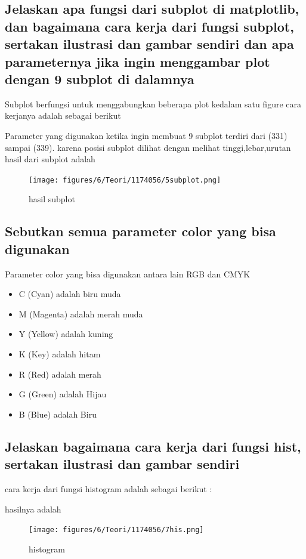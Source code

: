 \subsection{Jelaskan apa fungsi dari subplot di matplotlib, dan bagaimana cara kerja dari fungsi subplot, sertakan ilustrasi dan gambar sendiri dan apa parameternya jika ingin menggambar plot dengan 9 subplot di dalamnya}
Subplot berfungsi untuk menggabungkan beberapa plot kedalam satu figure
cara kerjanya adalah sebagai berikut

Parameter yang digunakan ketika ingin membuat 9 subplot terdiri dari (331) sampai (339). karena posisi subplot dilihat dengan melihat tinggi,lebar,urutan
hasil dari subplot adalah
\begin{figure}[H]
    \texttt{[image: figures/6/Teori/1174056/5subplot.png]}
    \caption{hasil subplot}
    \centering
\end{figure}

\subsection{Sebutkan semua parameter color yang bisa digunakan}
Parameter color yang bisa digunakan antara lain RGB dan CMYK
\begin{itemize}
    \item C (Cyan) adalah biru muda
    \item M (Magenta) adalah merah muda
    \item Y (Yellow) adalah kuning
    \item K (Key) adalah hitam
    \item R (Red) adalah merah
    \item G (Green) adalah Hijau
    \item B (Blue) adalah Biru
    
\end{itemize}

\subsection{Jelaskan bagaimana cara kerja dari fungsi hist, sertakan ilustrasi dan gambar sendiri}
cara kerja dari fungsi histogram adalah sebagai berikut :

hasilnya adalah
\begin{figure}[H]
    \texttt{[image: figures/6/Teori/1174056/7his.png]}
    \caption{histogram}
    \centering
\end{figure}

